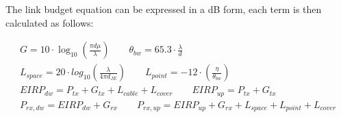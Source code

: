 
The link budget equation can be expressed in a dB form, each term is then calculated as follows:

\begin{gather}
    G = 10 \cdot \log_{10}\left(\frac{\pi d \mu}{\lambda}\right)
    \qquad
    \theta_{bw} = 65.3 \cdot \frac{\lambda}{d}   
    \\
    L_{space} = 20 \cdot log_{10}\left(\frac{\lambda}{4 \pi d_{JE}}\right)
    \qquad
    L_{point} = -12 \cdot \left(\frac{\eta}{\theta_{bw}}\right) 
    \\
    EIRP_{dw} = P_{tx} + G_{tx} + L_{cable} + L_{cover} 
    \qquad
    EIRP_{up} = P_{tx} + G_{tx}
    \\
    P_{rx,dw} = EIRP_{dw} + G_{rx}  
    \qquad
    P_{rx,up} = EIRP_{up} + G_{rx} + L_{space} + L_{point} + L_{cover}
\end{gather} 

